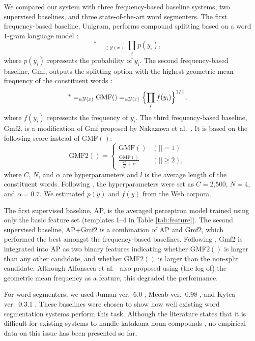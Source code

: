 \documentclass[english]{jnlp_1.4_rep}
\newcommand{\argmax}{}
\newcommand{\y}{}
\begin{document}
We compared our system with three frequency-based baseline systems, two
supervised baselines, and three state-of-the-art word segmenters. The
first frequency-based baseline, {\sc Unigram}, performs compound
splitting based on a word $1$-gram language model
\cite{Schiller05,AlfonsecaCICLing08}:
\[
 \y^{*}=\argmax_{\y\in\mathcal{Y}(x)}\prod_{i}p(y_i),
\]
where $p(y_i)$ represents the probability of $y_i$. The second
frequency-based baseline, {\sc Gmf}, outputs the splitting option with
the highest geometric mean frequency of the constituent words
\cite{Koehn03}:
\pagebreak
\[
 \y^{*}=\argmax_{\y\in\mathcal{Y}(x)}\mbox{GMF}(\y)=\argmax_{\y\in\mathcal{Y}(x)}\Bigl\{\prod_{i}f(y_i)\Bigr\}^{1/|\y|},
\]
where $f(y_i)$ represents the frequency of $y_i$. The third
frequency-based baseline, {\sc Gmf2}, is a modification of {\sc Gmf}
proposed by Nakazawa et al.\ \citeyear{Nakazawa05}. It is based on the
following score instead of GMF$(\y)$:
\[
 \mbox{GMF2}(\y)=
  \begin{cases}
   \mbox{GMF}(\y) & (|\y|=1) \\[10pt]
   \frac{\mbox{GMF}(\y)}{\frac{C}{N^l}+\alpha} & (|\y|\geq2),
\end{cases}
\]
where $C$, $N$, and $\alpha$ are hyperparameters and $l$ is the average
length of the constituent words. Following \cite{Nakazawa05}, the
hyperparameters were set as $C = \text{2,500}$, $N = 4$, and $\alpha =
0.7$. We estimated $p(y)$ and $f(y)$ from the Web corpora.

The first supervised baseline, {\sc AP}, is the averaged perceptron
model trained using only the basic feature set (templates 1--4 in Table
\ref{tab:feature}). The second supervised baseline, {\sc AP+Gmf2} is a
combination of {\sc AP} and {\sc Gmf2}, which performed the best amongst
the frequency-based baselines. Following \cite{AlfonsecaCICLing08}, {\sc
Gmf2} is integrated into {\sc AP} as two binary features indicating
whether GMF2$(\y)$ is larger than any other candidate, and whether
GMF2$(\y)$ is larger than the non-split candidate. Although Alfonseca et
al.\ \citeyear{AlfonsecaCICLing08} also proposed using (the log of) the
geometric mean frequency as a feature, this degraded the performance.

For word segmenters, we used Juman ver.~6.0 \cite{Kurohashi94},
Mecab ver.~0.98 \cite{Kudo04}, and Kytea ver.~0.3.1
\cite{Neubig11}. These baselines were chosen to show how well
existing word segmentation systems perform this task. Although the
literature states that it is difficult for existing systems to handle
katakana noun compounds \cite{Nakazawa05}, no empirical data on this
issue has been presented so far.
\end{document}
